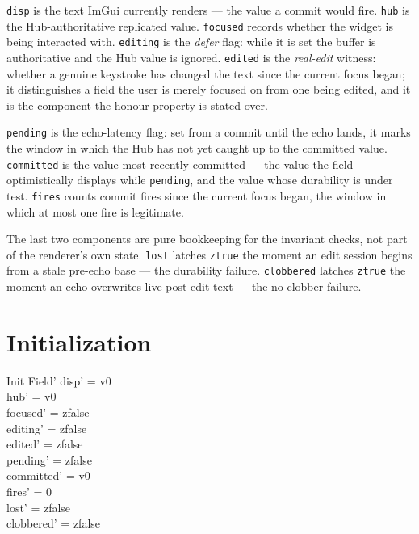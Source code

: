 \documentclass[a4paper,10pt,fleqn]{article}
\begin{document}
\texttt{disp} is the text ImGui currently renders --- the value a commit would
fire.  \texttt{hub} is the Hub-authoritative replicated value.  \texttt{focused}
records whether the widget is being interacted with.  \texttt{editing} is the
\emph{defer} flag: while it is set the buffer is authoritative and the Hub value
is ignored.  \texttt{edited} is the \emph{real-edit} witness: whether a genuine
keystroke has changed the text since the current focus began; it distinguishes a
field the user is merely focused on from one being edited, and it is the
component the honour property is stated over.

\texttt{pending} is the echo-latency flag: set from a commit until the echo
lands, it marks the window in which the Hub has not yet caught up to the
committed value.  \texttt{committed} is the value most recently committed --- the
value the field optimistically displays while \texttt{pending}, and the value
whose durability is under test.  \texttt{fires} counts commit fires since the
current focus began, the window in which at most one fire is legitimate.

The last two components are pure bookkeeping for the invariant checks, not part
of the renderer's own state.  \texttt{lost} latches \texttt{ztrue} the moment an
edit session begins from a stale pre-echo base --- the durability failure.
\texttt{clobbered} latches \texttt{ztrue} the moment an echo overwrites live
post-edit text --- the no-clobber failure.

\section{Initialization}

\begin{schema}{Init}
  Field'
\where
  disp' = v0 \\
  hub' = v0 \\
  focused' = zfalse \\
  editing' = zfalse \\
  edited' = zfalse \\
  pending' = zfalse \\
  committed' = v0 \\
  fires' = 0 \\
  lost' = zfalse \\
  clobbered' = zfalse
\end{schema}
\end{document}
